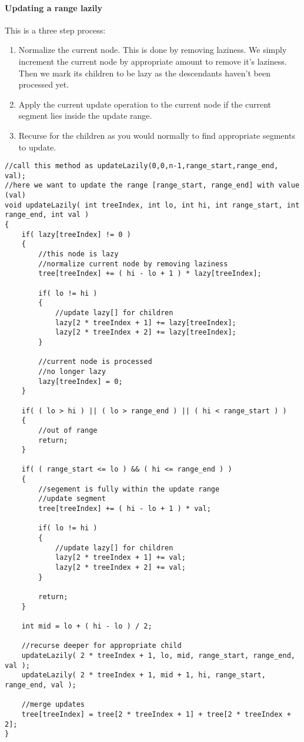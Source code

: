 \paragraph{Updating a range lazily}

This is a three step process:

\begin{enumerate}
\item Normalize the current node. This is done by removing laziness. We simply increment the current node by appropriate amount to remove it's laziness. Then we mark its children to be lazy as the descendants haven't been processed yet.
\item Apply the current update operation to the current node if the current segment lies inside the update range.
\item Recurse for the children as you would normally to find appropriate segments to update.
\end{enumerate}

\begin{lstlisting}[style=customc, caption={Update Lazily}]
//call this method as updateLazily(0,0,n-1,range_start,range_end, val);
//here we want to update the range [range_start, range_end] with value (val)
void updateLazily( int treeIndex, int lo, int hi, int range_start, int range_end, int val )
{
    if( lazy[treeIndex] != 0 )
    {
        //this node is lazy
        //normalize current node by removing laziness
        tree[treeIndex] += ( hi - lo + 1 ) * lazy[treeIndex];

        if( lo != hi )
        {
            //update lazy[] for children
            lazy[2 * treeIndex + 1] += lazy[treeIndex];
            lazy[2 * treeIndex + 2] += lazy[treeIndex];
        }

        //current node is processed
        //no longer lazy
        lazy[treeIndex] = 0;
    }

    if( ( lo > hi ) || ( lo > range_end ) || ( hi < range_start ) )
    {
        //out of range
        return;
    }

    if( ( range_start <= lo ) && ( hi <= range_end ) )
    {
        //segement is fully within the update range
        //update segment
        tree[treeIndex] += ( hi - lo + 1 ) * val;

        if( lo != hi )
        {
            //update lazy[] for children
            lazy[2 * treeIndex + 1] += val;
            lazy[2 * treeIndex + 2] += val;
        }

        return;
    }

    int mid = lo + ( hi - lo ) / 2;

    //recurse deeper for appropriate child
    updateLazily( 2 * treeIndex + 1, lo, mid, range_start, range_end, val );
    updateLazily( 2 * treeIndex + 1, mid + 1, hi, range_start, range_end, val );

    //merge updates
    tree[treeIndex] = tree[2 * treeIndex + 1] + tree[2 * treeIndex + 2];
}
\end{lstlisting}

